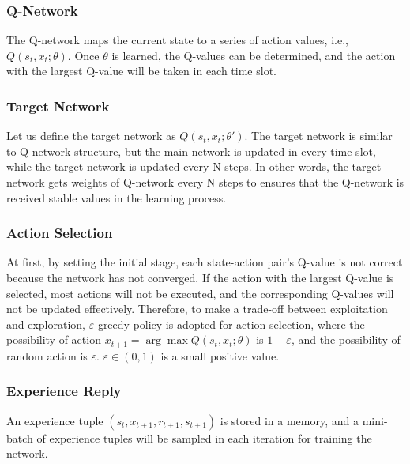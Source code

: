 \documentclass[journal]{IEEEtran}
\begin{document}
		\subsubsection{Q-Network}
			The Q-network maps the current state to a series of action values, i.e., $Q({s_t},{x_t};\theta )$. Once $\theta$ is learned, the Q-values can be determined, and the action with the largest Q-value will be taken in each time slot.
		\subsubsection{Target Network}
			Let us define the target network as $Q({s_t},{x_t};\theta ')$. The target network is similar to Q-network structure, but the main network is updated in every time slot, while the target network is updated every N steps. In other words, the target network gets weights of Q-network every N steps to ensures that the Q-network is received stable values in the learning process.
		\subsubsection{Action Selection}
			At first, by setting the initial stage, each state-action pair's Q-value is not correct because the network has not converged. If the action with the largest Q-value is selected, most actions will not be executed, and the corresponding Q-values will not be updated effectively. Therefore, to make a trade-off between exploitation and exploration, $\varepsilon$-greedy policy is adopted for action selection, where the possibility of action ${x_{t + 1}} = \arg \max  Q({s_t},{x_t};\theta )$ is $1-\varepsilon$, and the possibility of random action is $\varepsilon$. $\varepsilon  \in (0,1)$ is a small positive value.
		\subsubsection{Experience Reply}
			An experience tuple $(s_t, x_{t+1}, r_{t+1}, s_{t+1})$ is stored in a memory, and a mini-batch of experience tuples will be sampled in each iteration for training the network.
\end{document}
